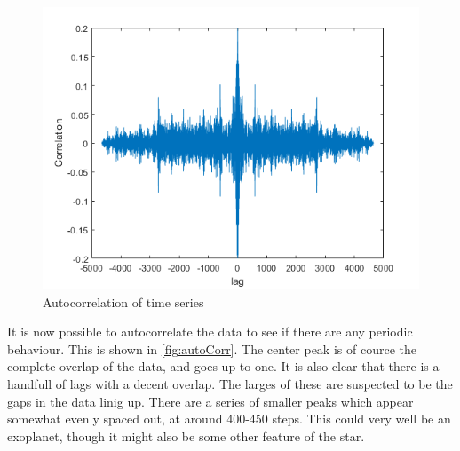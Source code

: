 \begin{figure}[h]
\centering
\includegraphics[widht=\textwidth]{matlabstuff/Kepler_autoCorr.png}
\caption{Autocorrelation of time series}
\label{fig:autoCorr}
\end{figure}

It is now possible to autocorrelate the data to see if there are any periodic behaviour. This is shown in \autoref{fig:autoCorr}. The center peak is of cource the complete overlap of the data, and goes up to one. It is also clear that there is a handfull of lags with a decent overlap. The larges of these are suspected to be the gaps in the data linig up. There are a series of smaller peaks which appear somewhat evenly spaced out, at around 400-450 steps. This could very well be an exoplanet, though it might also be some other feature of the star.


